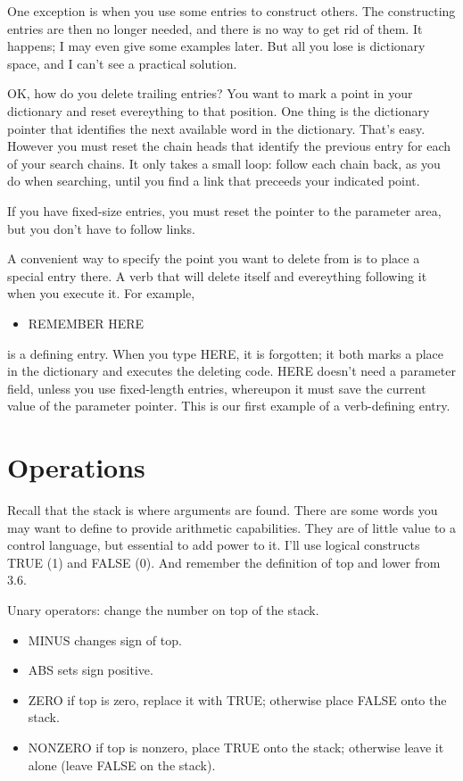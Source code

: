 \documentclass[b5paper, oneside]{book}
\begin{document}
One exception is when you use some entries to construct others. The constructing entries are then no longer needed, and there is no way to get rid of them. It happens; I may even give some examples later. But all you lose is dictionary space, and I can't see a practical solution.

OK, how do you delete trailing entries? You want to mark a point in your dictionary and reset evereything to that position. One thing is the dictionary pointer that identifies the next available word in the dictionary. That's easy. However you must reset the chain heads that identify the previous entry for each of your search chains. It only takes a small loop: follow each chain back, as you do when searching, until you find a link that preceeds your indicated point.

If you have fixed-size entries, you must reset the pointer to the parameter area, but you don't have to follow links.

A convenient way to specify the point you want to delete from is to place a special entry there. A verb that will delete itself and evereything following it when you execute it. For example,\begin{itemize}
   \item REMEMBER HERE\end{itemize}
is a defining entry. When you type HERE, it is forgotten; it both marks a place in the dictionary and executes the deleting code. HERE doesn't need a parameter field, unless you use fixed-length entries, whereupon it must save the current value of the parameter pointer. This is our first example of a verb-defining entry.

\section{Operations}
Recall that the stack is where arguments are found. There are some words you may want to define to provide arithmetic capabilities. They are of little value to a control language, but essential to add power to it. I'll use logical constructs TRUE (1) and FALSE (0). And remember the definition of top and lower from 3.6.

Unary operators: change the number on top of the stack.\begin{itemize}
   \item MINUS changes sign of top.
   \item ABS sets sign positive.
   \item ZERO if top is zero, replace it with TRUE; otherwise place FALSE onto the stack.
   \item NONZERO if top is nonzero, place TRUE onto the stack; otherwise leave it alone (leave FALSE on the stack).\end{itemize}
\end{document}

